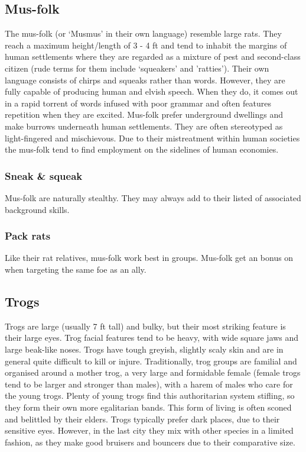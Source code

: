 \documentclass[a4paper,11pt,oneside]{book}
\newcommand{\textlf}[1]{\textbf{\titlecap{#1}}}
\begin{document}
\subsection{Mus-folk}
The mus-folk (or `Musmus' in their own language) resemble large rats. They reach a maximum height/length of 3 - 4 ft and tend to inhabit the margins of human settlements where they are regarded as a mixture of pest and second-class citizen (rude terms for them include `squeakers' and 'ratties'). Their own language consists of chirps and squeaks rather than words. However, they are fully capable of producing human and elvish speech. When they do, it comes out in a rapid torrent of words infused with poor grammar and often features repetition when they are excited. Mus-folk prefer underground dwellings and make burrows underneath human settlements. They are often stereotyped as light-fingered and mischievous. Due to their mistreatment within human societies the mus-folk tend to find employment on the sidelines of human economies.    

\subsubsection*{Sneak \& squeak}
Mus-folk are naturally stealthy. They may always add \textlf{stealth} to their listed of associated background skills. 

\subsubsection*{Pack rats}
Like their rat relatives, mus-folk work best in groups. Mus-folk get an \textlf{edge} bonus on \textlf{aim} when targeting the same foe as an ally. 


\subsection{Trogs}
Trogs are large (usually 7 ft tall) and bulky, but their most striking feature is their large eyes. Trog facial features tend to be heavy, with wide square jaws and large beak-like noses. Trogs have tough greyish, slightly scaly skin and are in general quite difficult to kill or injure. Traditionally, trog groups are familial and organised around a mother trog, a very large and formidable female (female trogs tend to be larger and stronger than males), with a harem of males who care for the young trogs. Plenty of young trogs find this authoritarian system stifling, so they form their own more egalitarian bands. This form of living is often sconed and belittled by their elders. Trogs typically prefer dark places, due to their sensitive eyes. However, in the last city they mix with other species in a limited fashion, as they make good bruisers and bouncers due to their comparative size.
\end{document}

